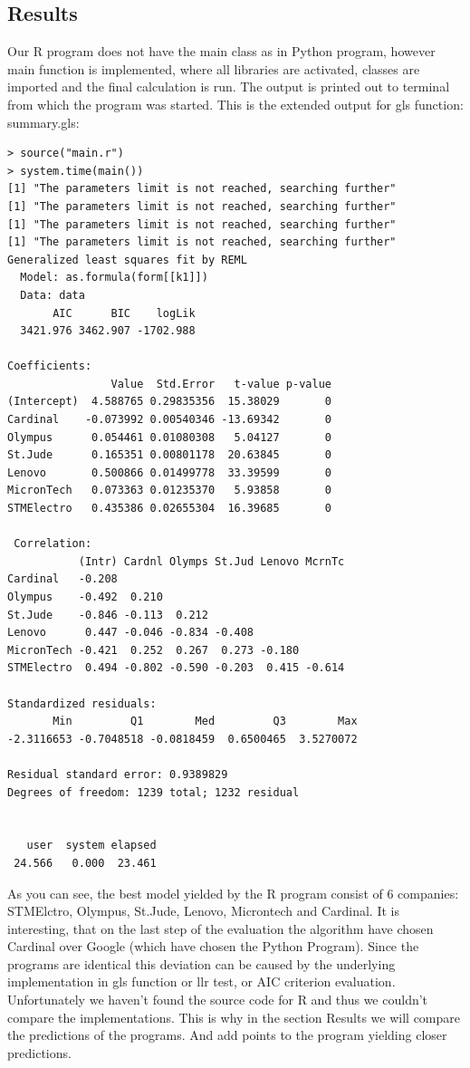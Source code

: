 \documentclass{article}
\begin{document}
\subsection{Results}
Our R program does not have the main class as in Python program, however main function is implemented, where all libraries are activated, classes are imported and the final calculation is run. The output is printed out to terminal from which the program was started. This is the extended output for gls function: summary.gls:
\begin{verbatim}
> source("main.r")
> system.time(main())
[1] "The parameters limit is not reached, searching further"
[1] "The parameters limit is not reached, searching further"
[1] "The parameters limit is not reached, searching further"
[1] "The parameters limit is not reached, searching further"
Generalized least squares fit by REML
  Model: as.formula(form[[k1]]) 
  Data: data 
       AIC      BIC    logLik
  3421.976 3462.907 -1702.988

Coefficients:
                Value  Std.Error   t-value p-value
(Intercept)  4.588765 0.29835356  15.38029       0
Cardinal    -0.073992 0.00540346 -13.69342       0
Olympus      0.054461 0.01080308   5.04127       0
St.Jude      0.165351 0.00801178  20.63845       0
Lenovo       0.500866 0.01499778  33.39599       0
MicronTech   0.073363 0.01235370   5.93858       0
STMElectro   0.435386 0.02655304  16.39685       0

 Correlation: 
           (Intr) Cardnl Olymps St.Jud Lenovo McrnTc
Cardinal   -0.208                                   
Olympus    -0.492  0.210                            
St.Jude    -0.846 -0.113  0.212                     
Lenovo      0.447 -0.046 -0.834 -0.408              
MicronTech -0.421  0.252  0.267  0.273 -0.180       
STMElectro  0.494 -0.802 -0.590 -0.203  0.415 -0.614

Standardized residuals:
       Min         Q1        Med         Q3        Max 
-2.3116653 -0.7048518 -0.0818459  0.6500465  3.5270072 

Residual standard error: 0.9389829 
Degrees of freedom: 1239 total; 1232 residual


   user  system elapsed 
 24.566   0.000  23.461 

\end{verbatim}    
As you can see, the best model yielded by the R program consist of 6 companies: STMElctro, Olympus, St.Jude, Lenovo, Microntech and Cardinal. It is interesting, that on the last step of the evaluation the algorithm have chosen Cardinal over Google (which have chosen the Python Program). Since the programs are identical this deviation can be caused by the underlying implementation in gls function or llr test, or AIC criterion evaluation. Unfortunately we haven't found the source code for R and thus we couldn't compare the implementations. This is why in the section Results we will compare the predictions of the programs. And add points to the program yielding closer predictions.\\
\end{document}
